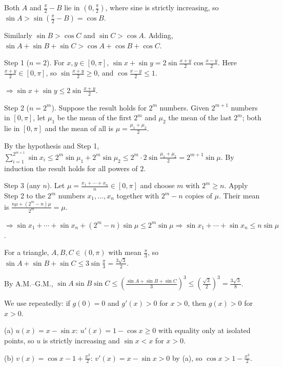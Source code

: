   Both $A$ and $\frac{\pi}{2} - B$ lie in $\left(0, \frac{\pi}{2}\right)$, where sine is strictly
  increasing, so $\sin A > \sin\left(\frac{\pi}{2} - B\right) = \cos B$.

  Similarly $\sin B > \cos C$ and $\sin C > \cos A$. Adding, $\sin A + \sin B + \sin C > \cos A + \cos B
  + \cos C$.
\item Step 1 ($n = 2$). For $x, y\in[0, \pi]$, $\sin x + \sin y = 2\sin\frac{x + y}{2}\cos\frac{x -
    y}{2}$. Here $\frac{x + y}{2}\in[0, \pi]$, so $\sin\frac{x + y}{2}\geq 0$, and $\cos\frac{x - y}{2}\leq
  1$.

  $\Rightarrow\sin x + \sin y\leq 2\sin\frac{x + y}{2}$.

  Step 2 ($n = 2^m$). Suppose the result holds for $2^m$ numbers. Given $2^{m + 1}$ numbers in $[0, \pi]$, let
  $\mu_1$ be the mean of the first $2^m$ and $\mu_2$ the mean of the last $2^m$; both lie in $[0, \pi]$ and
  the mean of all is $\mu = \frac{\mu_1 + \mu_2}{2}$.

  By the hypothesis and Step 1, $\displaystyle\sum_{i = 1}^{2^{m + 1}}\sin x_i\leq 2^m\sin\mu_1 + 2^m\sin\mu_2\leq
  2^m\cdot 2\sin\frac{\mu_1 + \mu_2}{2} = 2^{m + 1}\sin\mu$. By induction the result holds for all powers of
  $2$.

  Step 3 (any $n$). Let $\mu = \frac{x_1 + \cdots + x_n}{n}\in[0, \pi]$ and choose $m$ with $2^m\geq n$. Apply
  Step 2 to the $2^m$ numbers $x_1, \ldots, x_n$ together with $2^m - n$ copies of $\mu$. Their mean is
  $\frac{n\mu + (2^m - n)\mu}{2^m} = \mu$.

  $\Rightarrow\sin x_1 + \cdots + \sin x_n + (2^m - n)\sin\mu\leq 2^m\sin\mu\Rightarrow\sin x_1 + \cdots + \sin
  x_n\leq n\sin\mu$.

  For a triangle, $A, B, C\in(0, \pi)$ with mean $\frac{\pi}{3}$, so $\sin A + \sin B + \sin C\leq
  3\sin\frac{\pi}{3} = \frac{3\sqrt{3}}{2}$.

  By A.M.--G.M., $\sin A\sin B\sin C\leq\left(\frac{\sin A + \sin B + \sin
    C}{3}\right)^3\leq\left(\frac{\sqrt{3}}{2}\right)^3 = \frac{3\sqrt{3}}{8}$.
\item We use repeatedly: if $g(0) = 0$ and $g'(x) > 0$ for $x > 0$, then $g(x) > 0$ for $x > 0$.

  (a) $u(x) = x - \sin x$: $u'(x) = 1 - \cos x\geq 0$ with equality only at isolated points, so $u$ is
  strictly increasing and $\sin x < x$ for $x > 0$.

  (b) $v(x) = \cos x - 1 + \frac{x^2}{2}$: $v'(x) = x - \sin x > 0$ by (a), so $\cos x > 1 -
  \frac{x^2}{2}$.

